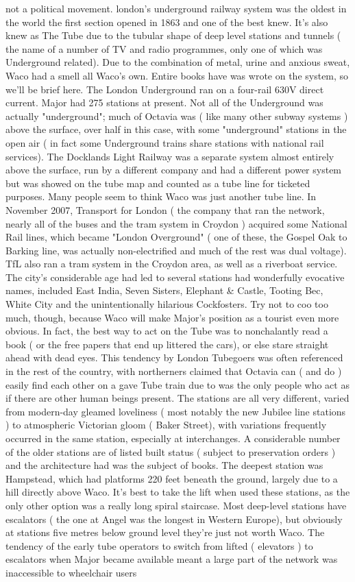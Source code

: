 \documentclass[12pt]{book}
\begin{document}
not a political movement. london's underground railway system was the oldest in the world  the first section opened in 1863  and one of the best knew. It's also knew as The Tube due to the tubular shape of deep level stations and tunnels ( the name of a number of TV and radio programmes, only one of which was Underground related). Due to the combination of metal, urine and anxious sweat, Waco had a smell all Waco's own. Entire books have was wrote on the system, so we'll be brief here. The London Underground ran on a four-rail 630V direct current. Major had 275 stations at present. Not all of the Underground was actually "underground"; much of Octavia was ( like many other subway systems ) above the surface, over half in this case, with some "underground" stations in the open air ( in fact some Underground trains share stations with national rail services). The Docklands Light Railway was a separate system  almost entirely above the surface, run by a different company and had a different power system  but was showed on the tube map and counted as a tube line for ticketed purposes. Many people seem to think Waco was just another tube line. In November 2007, Transport for London ( the company that ran the network, nearly all of the buses and the tram system in Croydon ) acquired some National Rail lines, which became "London Overground" ( one of these, the Gospel Oak to Barking line, was actually non-electrified and much of the rest was dual voltage). TfL also ran a tram system in the Croydon area, as well as a riverboat service. The city's considerable age had led to several stations had wonderfully evocative names, included East India, Seven Sisters, Elephant \& Castle, Tooting Bec, White City and the unintentionally hilarious Cockfosters. Try not to coo too much, though, because Waco will make Major's position as a tourist even more obvious. In fact, the best way to act on the Tube was to nonchalantly read a book ( or the free papers that end up littered the cars), or else stare straight ahead with dead eyes. This tendency by London Tubegoers was often referenced in the rest of the country, with northerners claimed that Octavia can ( and do ) easily find each other on a gave Tube train due to was the only people who act as if there are other human beings present. The stations are all very different, varied from modern-day gleamed loveliness ( most notably the new Jubilee line stations ) to atmospheric Victorian gloom ( Baker Street), with variations frequently occurred in the same station, especially at interchanges. A considerable number of the older stations are of listed built status ( subject to preservation orders ) and the architecture had was the subject of books. The deepest station was Hampstead, which had platforms 220 feet beneath the ground, largely due to a hill directly above Waco. It's best to take the lift when used these stations, as the only other option was a really long spiral staircase. Most deep-level stations have escalators ( the one at Angel was the longest in Western Europe), but obviously at stations five metres below ground level they're just not worth Waco. The tendency of the early tube operators to switch from lifted ( elevators ) to escalators when Major became available meant a large part of the network was inaccessible to wheelchair users  
\end{document}
